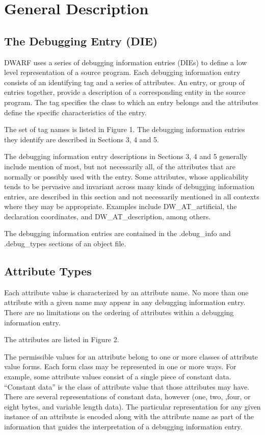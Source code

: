 \chapter{General Description}
\label{chap:generaldescription}
\section{The Debugging Entry (DIE)}
\label{chap:thedebuggingentrydie}
DWARF uses a series of debugging information entries (DIEs) to 
define a low\dash{} level
representation of a source program. 
Each debugging information entry consists of an identifying
tag and a series of attributes. 
An entry, or group of entries together, provide a description of a
corresponding entity in the source program. 
The tag specifies the class to which an entry belongs
and the attributes define the specific characteristics of the entry.

The set of tag names is listed in Figure 1. 
The debugging information entries they identify are
described in Sections 3, 4 and 5.

The debugging information entry descriptions 
in Sections 3, 4 and 5 generally include mention of
most, but not necessarily all, of the attributes 
that are normally or possibly used with the entry.
Some attributes, whose applicability tends to be 
pervasive and invariant across many kinds of
debugging information entries, are described in 
this section and not necessarily mentioned in all
contexts where they may be appropriate. 
Examples include DW\_AT\_artificial, the declaration
coordinates, and DW\_AT\_description, among others.

The debugging information entries are contained 
in the .debug\_info and .debug\_types
sections of an object file.



\section{Attribute Types}
\label{chap:attributetypes}
Each attribute value is characterized by an attribute name. 
No more than one attribute with a given name may appear in any
debugging information entry. 
There are no limitations on the
ordering of attributes within a debugging information entry.

The attributes are listed in Figure 2.  

The permissible values
for an attribute belong to one or more classes of attribute
value forms.  
Each form class may be represented in one or more ways. 
For example, some attribute values consist
of a single piece of constant data. 
``Constant data''
is the class of attribute value that those attributes may have. 
There are several representations of constant data,
however (one, two, ,four, or eight bytes, and variable length
data). 
The particular representation for any given instance
of an attribute is encoded along with the attribute name as
part of the information that guides the interpretation of a
debugging information entry.  

